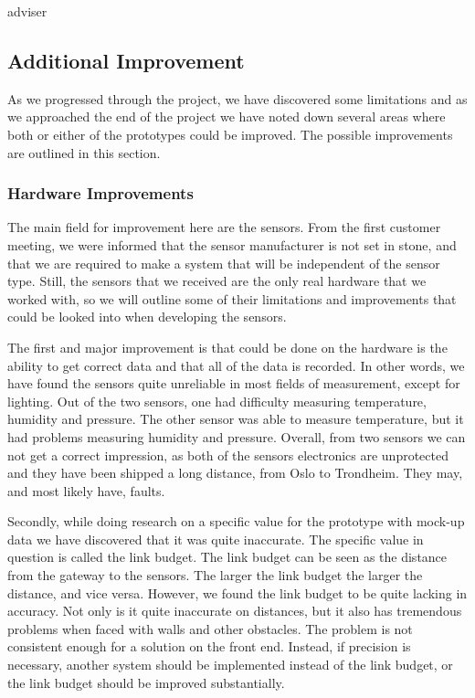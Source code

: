 adviser\documentclass[../document]{subfiles}
\begin{document}
\subsection{Additional Improvement}
As we progressed through the project, we have discovered some limitations and as we approached the end of the project we have noted down several areas where both or either of the prototypes could be improved. The possible improvements are outlined in this section.

\subsubsection{Hardware Improvements}
The main field for improvement here are the sensors. From the first customer meeting, we were informed that the sensor manufacturer is not set in stone, and that we are required to make a system that will be independent of the sensor type. Still, the sensors that we received are the only real hardware that we worked with, so we will outline some of their limitations and improvements that could be looked into when developing the sensors. 

The first and major improvement is that could be done on the hardware is the ability to get correct data and that all of the data is recorded. In other words, we have found the sensors quite unreliable in most fields of measurement, except for lighting. Out of the two sensors, one had difficulty measuring temperature, humidity and pressure. The other sensor was able to measure temperature, but it had problems measuring humidity and pressure. Overall, from two sensors we can not get a correct impression, as both of the sensors electronics are unprotected and they have been shipped a long distance, from Oslo to Trondheim. They may, and most likely have, faults.

Secondly, while doing research on a specific value for the prototype with mock-up data we have discovered that it was quite inaccurate. The specific value in question is called the link budget. The link budget can be seen as the distance from the gateway to the sensors. The larger the link budget the larger the distance, and vice versa. However, we found the link budget to be quite lacking in accuracy. Not only is it quite inaccurate on distances, but it also has tremendous problems when faced with walls and other obstacles. The problem is not consistent enough for a solution on the front end. Instead, if precision is necessary, another system should be implemented instead of the link budget, or the link budget should be improved substantially. 
\end{document}
